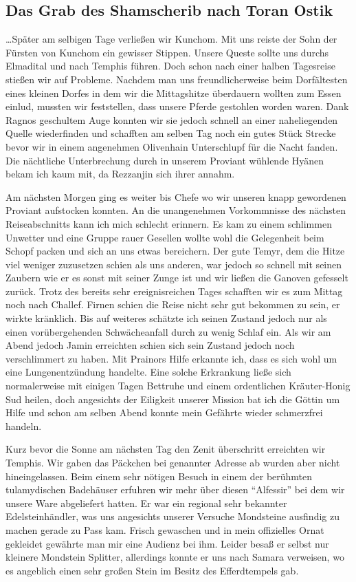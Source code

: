 \subsection{Das Grab des Shamscherib nach Toran Ostik}

\dots Später am selbigen Tage verließen wir Kunchom. Mit uns reiste der Sohn der Fürsten von Kunchom ein gewisser Stippen. Unsere Queste sollte uns durchs Elmadital und nach Temphis führen. Doch schon nach einer halben Tagesreise stießen wir auf Probleme. Nachdem man uns freundlicherweise beim Dorfältesten eines kleinen Dorfes in dem wir die Mittagshitze überdauern wollten zum Essen einlud, mussten wir feststellen, dass unsere Pferde gestohlen worden waren. Dank Ragnos geschultem Auge konnten wir sie jedoch schnell an einer naheliegenden Quelle wiederfinden und schafften am selben Tag noch ein gutes Stück Strecke bevor wir in einem angenehmen Olivenhain Unterschlupf für die Nacht fanden. Die nächtliche Unterbrechung durch in unserem Proviant wühlende Hyänen bekam ich kaum mit, da Rezzanjin sich ihrer annahm.

Am nächsten Morgen ging es weiter bis Chefe wo wir unseren knapp gewordenen Proviant aufstocken konnten. An die unangenehmen Vorkommnisse des nächsten Reiseabschnitts kann ich mich schlecht erinnern. Es kam zu einem schlimmen Unwetter und eine Gruppe rauer Gesellen wollte wohl die Gelegenheit beim Schopf packen und sich an uns etwas bereichern. Der gute Temyr, dem die Hitze viel weniger zuzusetzen schien als uns anderen, war jedoch so schnell mit seinen Zaubern wie er es sonst mit seiner Zunge ist und wir ließen die Ganoven gefesselt zurück. Trotz des bereits sehr ereignisreichen Tages schafften wir es zum Mittag noch nach Challef. Firnen schien die Reise nicht sehr gut bekommen zu sein, er wirkte kränklich. Bis auf weiteres schätzte ich seinen Zustand jedoch nur als einen vorübergehenden Schwächeanfall durch zu wenig Schlaf ein. Als wir am Abend jedoch Jamin erreichten schien sich sein Zustand jedoch noch verschlimmert zu haben. Mit Prainors Hilfe erkannte ich, dass es sich wohl um eine Lungenentzündung handelte. Eine solche Erkrankung ließe sich normalerweise mit einigen Tagen Bettruhe und einem ordentlichen Kräuter-Honig Sud heilen, doch angesichts der Eiligkeit unserer Mission bat ich die Göttin um Hilfe und schon am selben Abend konnte mein Gefährte wieder schmerzfrei handeln.

Kurz bevor die Sonne am nächsten Tag den Zenit überschritt erreichten wir Temphis. Wir gaben das Päckchen bei genannter Adresse ab wurden aber nicht hineingelassen. Beim einem sehr nötigen Besuch in einem der berühmten tulamydischen Badehäuser erfuhren wir mehr über diesen ``Alfessir'' bei dem wir unsere Ware abgeliefert hatten. Er war ein regional sehr bekannter Edelsteinhändler, was uns angesichts unserer Versuche Mondsteine ausfindig zu machen gerade zu Pass kam. Frisch gewaschen und in mein offizielles Ornat gekleidet gewährte man mir eine Audienz bei ihm. Leider besaß er selbst nur kleinere Mondstein Splitter, allerdings konnte er uns nach Samara verweisen, wo es angeblich einen sehr großen Stein im Besitz des Efferdtempels gab.

